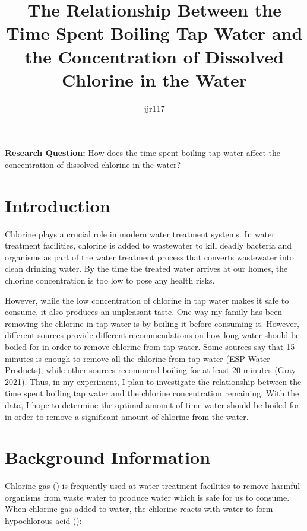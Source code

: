 \documentclass[11pt]{article}
\title{The Relationship Between the Time Spent Boiling Tap Water and the Concentration of Dissolved Chlorine in the Water}
\author{jjr117}
\date{}
\begin{document}
\begin{titlingpage}
	\maketitle
\end{titlingpage}

\noindent\textbf{Research Question:} How does the time spent boiling tap water affect the concentration of dissolved chlorine in the water?

\section{Introduction}

Chlorine plays a crucial role in modern water treatment systems. In water treatment facilities, chlorine is added to wastewater to kill deadly bacteria and organisms as part of the water treatment process that converts wastewater into clean drinking water. By the time the treated water arrives at our homes, the chlorine concentration is too low to pose any health risks.

However, while the low concentration of chlorine in tap water makes it safe to consume, it also produces an unpleasant taste. One way my family has been removing the chlorine in tap water is by boiling it before consuming it. However, different sources provide different recommendations on how long water should be boiled for in order to remove chlorine from tap water. Some sources say that 15 minutes is enough to remove all the chlorine from tap water (ESP Water Products), while other sources recommend boiling for at least 20 minutes (Gray 2021). Thus, in my experiment, I plan to investigate the relationship between the time spent boiling tap water and the chlorine concentration remaining. With the data, I hope to determine the optimal amount of time water should be boiled for in order to remove a significant amount of chlorine from the water.

\section{Background Information}

Chlorine gas () is frequently used at water treatment facilities to remove harmful organisms from waste water to produce water which is safe for us to consume. When chlorine gas added to water, the chlorine reacts with water to form hypochlorous acid ():

\centerline{}
\end{document}
